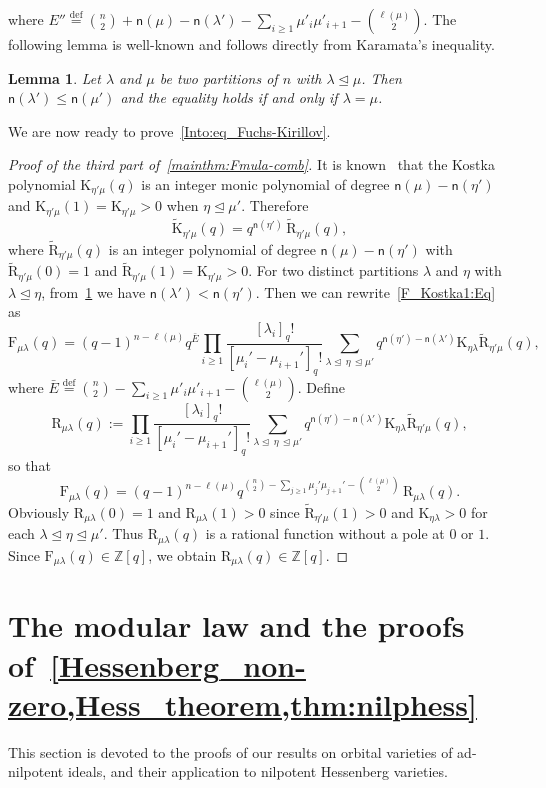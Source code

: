 \documentclass[12pt,a4paper,reqno]{amsart}
\theoremstyle{plain}
\newtheorem{lemma}[theorem]{Lemma}
\theoremstyle{definition}
\newcommand{\defin}{\overset{\mathrm{def}}{=}}
\newcommand{\less}{\unlhd}
\newcommand{\ZZ}{{\mathbb{Z}}}
\newcommand{\1}{\mathds{1}}
\newcommand{\F}{\mathrm{F}}
\newcommand{\K}{{\mathrm{K}}}
\newcommand{\R}{\mathrm{R}}
\newcommand{\fn}{\mathsf{n}}
\begin{document}
where $E''\defin{\binom{n}{2}+\fn(\mu)-\fn(\lambda')-\sum_{i\geq 1}\mu'_i\mu'_{i+1}-\binom{\ell(\mu)}{2}}$. 
The following lemma is well-known and follows directly from Karamata's inequality.  
\begin{lemma}\label{n_ineq}
Let $\lambda$ and $\mu$ be two partitions of $n$ with $\lambda\less \mu$. Then $\fn(\lambda')\leq \fn(\mu')$ and the equality holds if and only if $\lambda=\mu$.
\end{lemma}
We are now ready to prove~\cref{Into:eq_Fuchs-Kirillov}.
\begin{proof}[Proof of the third part of~\cref{mainthm:Fmula-comb}]
It is known~\cite[p. 242, Eq. (6.5)]{Macdonald} that the Kostka polynomial $\K_{\eta'\mu}(q)$ is an integer monic polynomial of degree $\fn(\mu)-\fn(\eta')$ and $\K_{\eta'\mu}(1)=\K_{\eta'\mu}> 0$ when $\eta\less\mu'$. Therefore 
$$
\tilde{\K}_{\eta'\mu}(q)=q^{\fn(\eta')}\,\tilde{\R}_{\eta'\mu}(q),
$$
where $\tilde{\R}_{\eta'\mu}(q)$ is an integer polynomial of degree $\fn(\mu)-\fn(\eta')$ with $\tilde{\R}_{\eta'\mu}(0)=1$ and $\tilde{\R}_{\eta'\mu}(1)=\K_{\eta'\mu}>0$. For two distinct partitions $\lambda$ and $\eta$ with $\lambda\less \eta$, from~\cref{n_ineq}  we have $\fn(\lambda')< \fn(\eta')$. Then we can rewrite~\cref{F_Kostka1:Eq} as 
\begin{equation*}
\F_{\mu\lambda}(q)=(q-1)^{n-\ell(\mu)}
q^{\bar E}\prod_{i\geq 1}\frac{[\lambda_i]_q!}{[\mu_i'-\mu_{i+1}']_q!}\sum_{\lambda\less\, \eta\,\less\mu'} q^{\fn(\eta')-\fn(\lambda')}\K_{\eta\lambda}\tilde{\R}_{\eta'\mu}(q),
\end{equation*}
where $\bar E\defin{\binom{n}{2}-\sum_{i\geq 1}\mu'_i\mu'_{i+1}-\binom{\ell(\mu)}{2}}$. Define 
$$
\R_{\mu\lambda}(q):=\prod_{i\geq 1}\frac{[\lambda_i]_q!}{[\mu_i'-\mu_{i+1}']_q!}\sum_{\lambda\less\, \eta\,\less\mu'} q^{\fn(\eta')-\fn(\lambda')}\K_{\eta\lambda}\tilde{\R}_{\eta'\mu}(q),
$$
so that
$$
\F_{\mu\lambda}(q)=(q-1)^{n-\ell(\mu)}q^{\binom{n}{2}-\sum_{j\geq 1}\mu_j'\mu_{j+1}'-\binom{\ell(\mu)}{2}}\, \R_{\mu\lambda}(q).
$$
Obviously $\R_{\mu\lambda}(0)=1$ and $\R_{\mu\lambda}(1)> 0$ since $\tilde{\R}_{\eta'\mu}(1)>0$ and $\K_{\eta\lambda}>0$ for each $\lambda\less \eta\less\mu'$. 
Thus $\R_{\mu\lambda}(q)$ is a rational function without a pole at $0$ or $1$. Since $\F_{\mu\lambda}(q) \in \ZZ[q]$, we obtain
$\R_{\mu\lambda}(q)\in \ZZ[q]$.
\end{proof}



\section{The modular law and the proofs of~\cref{Hessenberg_non-zero,Hess_theorem,thm:nilphess}
}
This section is devoted to the proofs of our results on orbital varieties of ad-nilpotent ideals, and their application to nilpotent Hessenberg varieties. 
\end{document}
